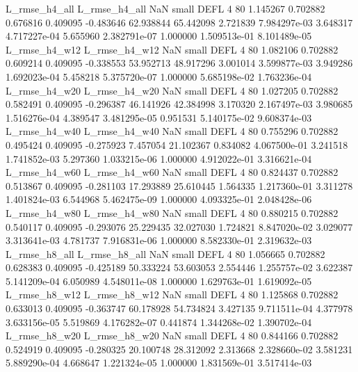  L_rmse_h4_all  L_rmse_h4_all                   NaN      small     DEFL                 4 80 1.145267       0.702882 0.676816       0.409095   -0.483646     62.938844     65.442098     2.721839   7.984297e-03  3.648317 4.717227e-04     5.655960   2.382791e-07            1.000000    1.509513e-01        8.101489e-05
 L_rmse_h4_w12  L_rmse_h4_w12                   NaN      small     DEFL                 4 80 1.082106       0.702882 0.609214       0.409095   -0.338553     53.952713     48.917296     3.001014   3.599877e-03  3.949286 1.692023e-04     5.458218   5.375720e-07            1.000000    5.685198e-02        1.763236e-04
 L_rmse_h4_w20  L_rmse_h4_w20                   NaN      small     DEFL                 4 80 1.027205       0.702882 0.582491       0.409095   -0.296387     46.141926     42.384998     3.170320   2.167497e-03  3.980685 1.516276e-04     4.389547   3.481295e-05            0.951531    5.140175e-02        9.608374e-03
 L_rmse_h4_w40  L_rmse_h4_w40                   NaN      small     DEFL                 4 80 0.755296       0.702882 0.495424       0.409095   -0.275923      7.457054     21.102367     0.834082   4.067500e-01  3.241518 1.741852e-03     5.297360   1.033215e-06            1.000000    4.912022e-01        3.316621e-04
 L_rmse_h4_w60  L_rmse_h4_w60                   NaN      small     DEFL                 4 80 0.824437       0.702882 0.513867       0.409095   -0.281103     17.293889     25.610445     1.564335   1.217360e-01  3.311278 1.401824e-03     6.544968   5.462475e-09            1.000000    4.093325e-01        2.048428e-06
 L_rmse_h4_w80  L_rmse_h4_w80                   NaN      small     DEFL                 4 80 0.880215       0.702882 0.540117       0.409095   -0.293076     25.229435     32.027030     1.724821   8.847020e-02  3.029077 3.313641e-03     4.781737   7.916831e-06            1.000000    8.582330e-01        2.319632e-03
 L_rmse_h8_all  L_rmse_h8_all                   NaN      small     DEFL                 4 80 1.056665       0.702882 0.628383       0.409095   -0.425189     50.333224     53.603053     2.554446   1.255757e-02  3.622387 5.141209e-04     6.050989   4.548011e-08            1.000000    1.629763e-01        1.619092e-05
 L_rmse_h8_w12  L_rmse_h8_w12                   NaN      small     DEFL                 4 80 1.125868       0.702882 0.633013       0.409095   -0.363747     60.178928     54.734824     3.427135   9.711511e-04  4.377978 3.633156e-05     5.519869   4.176282e-07            0.441874    1.344268e-02        1.390702e-04
 L_rmse_h8_w20  L_rmse_h8_w20                   NaN      small     DEFL                 4 80 0.844166       0.702882 0.524919       0.409095   -0.280325     20.100748     28.312092     2.313668   2.328660e-02  3.581231 5.889290e-04     4.668647   1.221324e-05            1.000000    1.831569e-01        3.517414e-03
